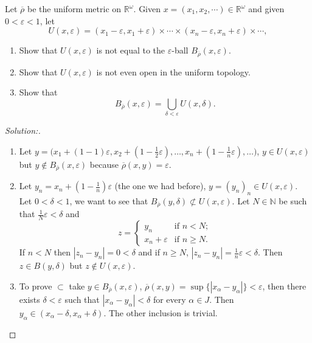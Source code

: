 \documentclass[a4paper,12pt, reqno]{article}
\theoremstyle{definition}
\newenvironment{exerr}[1]{
  \renewcommand\theexeralt{#1}
  \exeralt
}{\endexeralt}
\newenvironment{solution}{\begin{proof}[Solution:]}{\end{proof}}
\newcommand{\R}{\mathbb{R}}
\newcommand{\N}{\mathbb{N}}
\begin{document}
\begin{exerr}{6}
  Let $\overline{\rho}$ be the uniform metric on $\R^\omega$. Given $x = (x_{1},x_{2},\cdots)\in\R^\omega$ and given $0<\varepsilon<1$, let
  \begin{equation*}
    U(x,\varepsilon) = (x_{1}-\varepsilon,x_{1}+\varepsilon)\times\cdots\times(x_{n}-\varepsilon,x_{n}+\varepsilon)\times\cdots,
  \end{equation*}
  \begin{enumerate}[label=(\alph*)]
    \item Show that $U(x,\varepsilon)$ is not equal to the $\varepsilon$-ball $B_{\overline{\rho}}(x,\varepsilon)$.
    \item Show that $U(x,\varepsilon)$ is not even open in the uniform topology.
    \item Show that
          \begin{equation*}
            B_{\overline{\rho}}(x,\varepsilon) = \bigcup_{\delta<\varepsilon}U(x,\delta).
          \end{equation*}
  \end{enumerate}
\end{exerr}
\begin{solution}\hfill
  \begin{enumerate}[label=(\alph*)]
    \item Let $y = \big( x_{1}+(1-1)\varepsilon,x_{2}+(1-\frac{1}{2}\varepsilon), \dots,x_{n}+(1-\frac{1}{n}\varepsilon),\dots \big)$, $y\in U(x,\varepsilon)$ but $y\notin B_{\overline{\rho}}(x,\varepsilon)$ because $\overline{\rho}(x,y) = \varepsilon$.
    \item Let $y_{n} = x_{n}+(1-\frac{1}{n})\varepsilon$ (the one we had before), $y = (y_{n})_{n}\in U(x,\varepsilon)$. Let $0<\delta<1$, we want to see that $B_{\overline{\rho}}(y,\delta)\not\subset U(x,\varepsilon)$. Let $N\in\N$ be such that $\frac{1}{N}\varepsilon<\delta$ and
          \begin{equation*}
            z = \begin{cases}
              y_{n}             & \text{if }n<N;     \\
              x_{n}+\varepsilon & \text{if }n\geq N.
            \end{cases}
          \end{equation*}
          If $n<N$ then $|z_{n}-y_{n}|=0<\delta$ and if $n\geq N$, $|z_{n}-y_{n}| = \frac{1}{n}\varepsilon<\delta$. Then $z\in B(y,\delta)$ but $z\notin U(x,\varepsilon)$.
    \item To prove $\subset$ take $y\in B_{\overline{\rho}}(x,\varepsilon)$, $\overline{\rho}(x,y) = \sup\{ |x_{\alpha}-y_{\alpha}| \}<\varepsilon$, then there exists $\delta<\varepsilon$ such that $|x_{\alpha}-y_{\alpha}|<\delta$ for every $\alpha\in J$. Then $y_{\alpha}\in(x_{\alpha}-\delta, x_{\alpha}+\delta)$. The other inclusion is trivial.
  \end{enumerate}
\end{solution}
\end{document}
